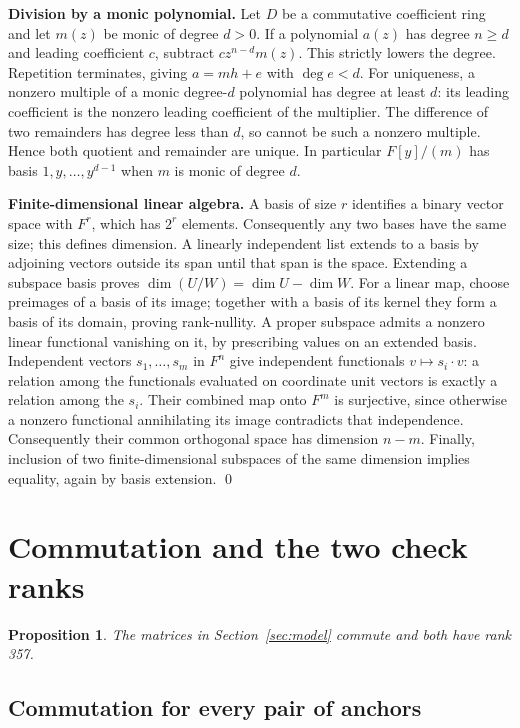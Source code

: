 \documentclass{article}
\newtheorem{proposition}{Proposition}
\begin{document}
\textbf{Division by a monic polynomial.} Let \(D\) be a commutative coefficient ring and let
\(m(z)\) be monic of degree \(d > 0\). If a polynomial \(a(z)\) has degree \(n \ge d\) and
leading coefficient \(c\), subtract \(c z^{n-d} m(z)\). This strictly lowers the degree.
Repetition terminates, giving \(a = m h + e\) with \(\deg e < d\). For uniqueness, a nonzero
multiple of a monic degree-\(d\) polynomial has degree at least \(d\): its leading coefficient
is the nonzero leading coefficient of the multiplier. The difference of two remainders has
degree less than \(d\), so cannot be such a nonzero multiple. Hence both quotient and
remainder are unique. In particular \(F[y]/(m)\) has basis \(1, y, \dots, y^{d-1}\) when
\(m\) is monic of degree \(d\).

\textbf{Finite-dimensional linear algebra.} A basis of size \(r\) identifies a binary vector
space with \(F^r\), which has \(2^r\) elements. Consequently any two bases have the same size;
this defines dimension. A linearly independent list extends to a basis by adjoining vectors
outside its span until that span is the space. Extending a subspace basis proves
\(\dim(U/W) = \dim U - \dim W\). For a linear map, choose preimages of a basis of its image;
together with a basis of its kernel they form a basis of its domain, proving rank-nullity. A
proper subspace admits a nonzero linear functional vanishing on it, by prescribing values on
an extended basis. Independent vectors \(s_1, \dots, s_m\) in \(F^n\) give independent
functionals \(v \mapsto s_i \cdot v\): a relation among the functionals evaluated on
coordinate unit vectors is exactly a relation among the \(s_i\). Their combined map onto
\(F^m\) is surjective, since otherwise a nonzero functional annihilating its image contradicts
that independence. Consequently their common orthogonal space has dimension \(n - m\).
Finally, inclusion of two finite-dimensional subspaces of the same dimension implies
equality, again by basis extension. \qed

\section{Commutation and the two check ranks}\label{sec:ranks}

\begin{proposition}\label{prop:ranks}
  The matrices in Section~\ref{sec:model} commute and both have rank 357.
\end{proposition}

\subsection{Commutation for every pair of anchors}\label{sec:commutation}
\end{document}
